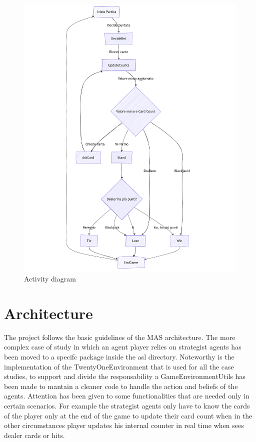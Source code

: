 \begin{figure}[!htb]
    \centering
    \includegraphics[scale=0.55]{report/img/activityDiagram.png}
    \caption{Activity diagram}
    \label{fig:activityDiagram}
\end{figure}


\section{Architecture}

The project follows the basic guidelines of the MAS architecture. The more complex case of study in which an agent player relies on strategist agents has been moved to a specifc package inside the asl directory. Noteworthy is the implementation of the TwentyOneEnvironment that is used for all the case studies, to support and divide the responsability a GameEnvironmentUtils has been made to mantain a cleaner code to handle the action and beliefs of the agents. Attention has been given to some functionalities that are needed only in certain scenarios. For example the strategist agents only have to know the cards of the player only at the end of the game to update their card count when in the other circumstances player updates his internal counter in real time when sees dealer cards or hits.

